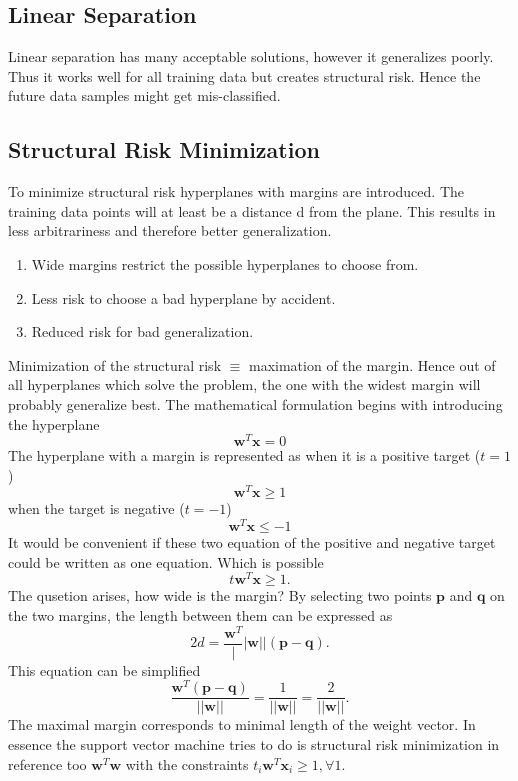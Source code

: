 \documentclass[12pt]{article}
\numberwithin{equation}{section}
\begin{document}
\subsection{Linear Separation}
Linear separation has many acceptable solutions, however it generalizes poorly. Thus it works well for all training data but creates structural risk. Hence the future data samples might get mis-classified. 
\subsection{Structural Risk Minimization}
To minimize structural risk hyperplanes with margins are introduced. The training data points will at least be a distance d from the plane. This results in less arbitrariness and therefore better generalization.
\begin{enumerate}
    \item Wide margins restrict the possible hyperplanes to choose from.
    \item Less risk to choose a bad  hyperplane by accident.
    \item Reduced risk for bad generalization.
\end{enumerate}
Minimization of the structural risk $\equiv$ maximation of the margin. Hence out of all hyperplanes which solve the problem, the one with the widest margin will probably generalize best. The mathematical formulation begins with introducing the hyperplane
\begin{equation}
    \bm{w}^T\bm{x} = 0
\end{equation}
The hyperplane with a margin is represented as when it is a positive target ($t = 1$)
\begin{equation}
    \bm{w}^T\bm{x} \geq 1
\end{equation}
when the target is negative ($t = -1$)
\begin{equation}
    \bm{w}^T\bm{x} \leq -1
\end{equation}
It would be convenient if these two equation of the positive and negative target could be written as one equation. Which is possible
\begin{equation}
    t \bm{w}^T\bm{x} \geq 1.
\end{equation}
The qusetion arises, how wide is the margin? By selecting two points $\bm{p}$ and $\bm{q}$ on the two margins, the length between them can be expressed as 
\begin{equation}
    2d = \frac{\bm{w}^T}||{\bm{w}||} (\bm{p}-\bm{q}).
\end{equation}
This equation can be simplified
\begin{equation}
    \frac{\bm{w}^T(\bm{p}-\bm{q})}{||\bm{w}||} = \frac{1}{||\bm{w}||} = \frac{2}{||\bm{w}||}.
\end{equation}
The maximal margin corresponds to minimal length of the weight vector. In essence the support vector machine tries to do is structural risk minimization in reference too $\bm{w}^T\bm{w}$ with the constraints $t_i \bm{w}^T \bm{x}_i \geq 1, \forall 1$.
\end{document}

